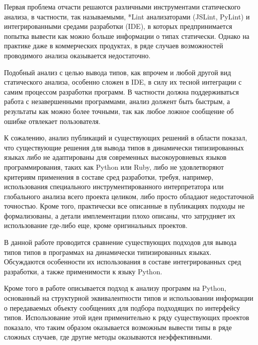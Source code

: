 Первая проблема отчасти решаются различными инструментами статического
анализа, в частности, так называемыми, *Lint анализаторами (JSLint, PyLint) и
интегрированными средами разработки (IDE), в которых предпринимается попытка
вывести как можно больше информации о типах статически.  Однако на практике даже
в коммерческих продуктах, в ряде случаев возможностей проводимого анализа
оказывается недостаточно.

Подобный анализ с целью вывода типов, как впрочем и любой другой вид
статического анализа, особенно сложен в IDE, в силу их тесной
интеграции с самим процессом разработки программ. В частности должна
поддерживаться работа с незавершенными программами, анализ должент быть быстрым,
а результаты как можно более точными, так как любое ложное сообщение об ошибке
отвлекает пользователя.

К сожалению, анализ публикаций и существующих решений в области показал, что
существующие решения для вывода типов в динамически типизированных языках либо
не адаптированы для современных высокоуровневых языков программирования, таких
как Python или Ruby, либо не удовлетворяют критериям применения в составе сред
разработки, требуя, например, использования специального инструментированного
интерпретатора или глобального анализа всего проекта целиком, либо просто
обладают недостаточной точностью. Кроме того, практически все описанные в публикациях
подходы не формализованы, а детали имплементации плохо описаны, что
затрудняет их использование где-либо еще, кроме оригинальных проектов.

В данной работе проводится сравнение существующих подходов для
вывода типов типов в программах на динамически типизированных языках.
Обсуждаются особенности их использования в составе интегрированных
сред разработки, а также применимости к языку Python.

Кроме того в работе описывается подход к анализу программ на Python, основанный
на структурной эквивалентности типов и использовании информации о передаваемых
объекту сообщениях для подбора подходящих по интерфейсу типов. Использование
этой идеи применительно к ряду существующих проектов показало, что таким
образом оказывается возможным вывести типы в ряде сложных случаев, где другие
методы оказываются неэффективными.


